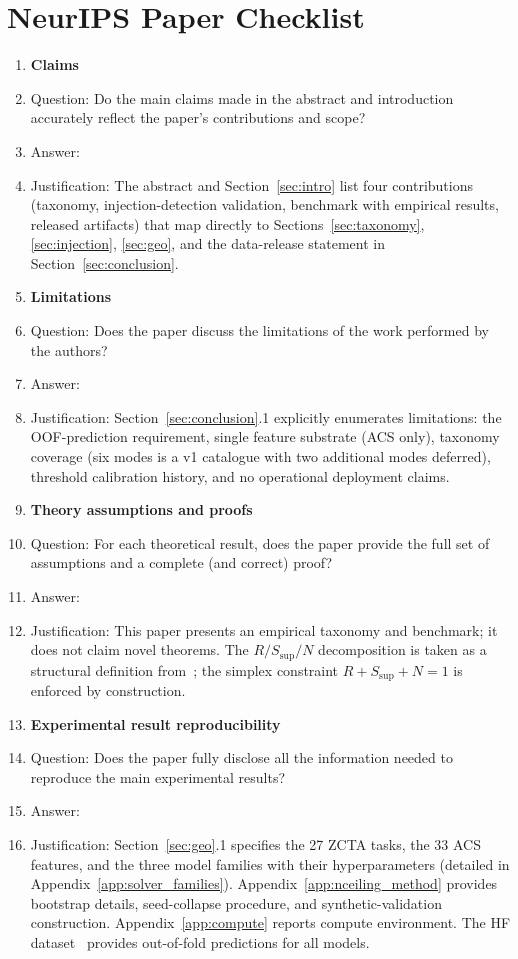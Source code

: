 \section*{NeurIPS Paper Checklist}

\begin{enumerate}

\item {\bf Claims}
    \item[] Question: Do the main claims made in the abstract and introduction accurately reflect the paper's contributions and scope?
    \item[] Answer: \answerYes{}
    \item[] Justification: The abstract and Section~\ref{sec:intro} list four contributions (taxonomy, injection-detection validation, benchmark with empirical results, released artifacts) that map directly to Sections~\ref{sec:taxonomy}, \ref{sec:injection}, \ref{sec:geo}, and the data-release statement in Section~\ref{sec:conclusion}.

\item {\bf Limitations}
    \item[] Question: Does the paper discuss the limitations of the work performed by the authors?
    \item[] Answer: \answerYes{}
    \item[] Justification: Section~\ref{sec:conclusion}.1 explicitly enumerates limitations: the OOF-prediction requirement, single feature substrate (ACS only), taxonomy coverage (six modes is a v1 catalogue with two additional modes deferred), threshold calibration history, and no operational deployment claims.

\item {\bf Theory assumptions and proofs}
    \item[] Question: For each theoretical result, does the paper provide the full set of assumptions and a complete (and correct) proof?
    \item[] Answer: \answerNA{}
    \item[] Justification: This paper presents an empirical taxonomy and benchmark; it does not claim novel theorems. The $R/S_{\text{sup}}/N$ decomposition is taken as a structural definition from~\citep{martin2026rsct}; the simplex constraint $R{+}S_{\text{sup}}{+}N{=}1$ is enforced by construction.

\item {\bf Experimental result reproducibility}
    \item[] Question: Does the paper fully disclose all the information needed to reproduce the main experimental results?
    \item[] Answer: \answerYes{}
    \item[] Justification: Section~\ref{sec:geo}.1 specifies the 27 ZCTA tasks, the 33 ACS features, and the three model families with their hyperparameters (detailed in Appendix~\ref{app:solver_families}). Appendix~\ref{app:nceiling_method} provides bootstrap details, seed-collapse procedure, and synthetic-validation construction. Appendix~\ref{app:compute} reports compute environment. The HF dataset~\citep{geocert2026} provides out-of-fold predictions for all models.


\end{enumerate}

